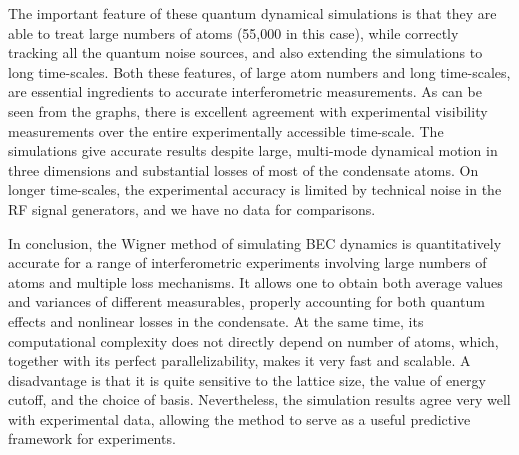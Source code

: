 \documentclass[aps,prl,twocolumn,showpacs,amsmath,amssymb,superscriptaddress]{revtex4-1}
\begin{document}
The important feature of these quantum dynamical simulations
is that they are able to treat large numbers of atoms (55,000 in this case),
while correctly tracking all the quantum noise sources, and also extending the simulations to long time-scales.
Both these features, of large atom numbers and long time-scales,
are essential ingredients to accurate interferometric measurements.
As can be seen from the graphs, there is excellent agreement
with experimental visibility measurements over the entire experimentally accessible time-scale.
The simulations give accurate results despite large, multi-mode dynamical motion in three dimensions
and substantial losses of most of the condensate atoms.
On longer time-scales, the experimental accuracy is limited by technical noise in the RF signal generators,
and we have no data for comparisons.

In conclusion, the Wigner method of simulating BEC dynamics
is quantitatively accurate  for a range of interferometric experiments
involving large numbers of atoms and multiple loss mechanisms.
It allows one to obtain both average values and variances of different measurables,
properly accounting for both quantum effects and nonlinear losses in the condensate.
At the same time, its computational complexity does not directly depend on number of atoms,
which, together with its perfect parallelizability, makes it very fast and scalable.
A disadvantage is that it is quite sensitive to the lattice size, the value of energy cutoff, and
the choice of basis.
Nevertheless,  the simulation results agree very well with experimental data,
allowing the method to serve as a useful predictive framework for experiments.


\end{document}

